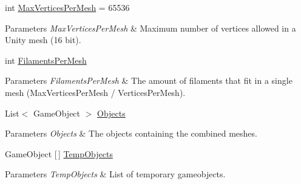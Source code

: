 \begin{DoxyCompactItemize}
int \hyperlink{class_filament_manager_a9401bd69ba21204265cd78a9a94e5b25}{Max\+Vertices\+Per\+Mesh} = 65536
\begin{DoxyCompactList}\small\item\em 
\begin{DoxyParams}{Parameters}
{\em Max\+Vertices\+Per\+Mesh} & Maximum number of vertices allowed in a Unity mesh (16 bit).\\
\hline
\end{DoxyParams}
\end{DoxyCompactList}\item 
\mbox{\label{class_filament_manager_af7195c81156bf891185196a90f6459ca}} 
int \hyperlink{class_filament_manager_af7195c81156bf891185196a90f6459ca}{Filaments\+Per\+Mesh}
\begin{DoxyCompactList}\small\item\em 
\begin{DoxyParams}{Parameters}
{\em Filaments\+Per\+Mesh} & The amount of filaments that fit in a single mesh (Max\+Vertices\+Per\+Mesh / Vertices\+Per\+Mesh).\\
\hline
\end{DoxyParams}
\end{DoxyCompactList}\item 
\mbox{\label{class_filament_manager_ac2355633fcdba276a7759483288e2555}} 
List$<$ Game\+Object $>$ \hyperlink{class_filament_manager_ac2355633fcdba276a7759483288e2555}{Objects}
\begin{DoxyCompactList}\small\item\em 
\begin{DoxyParams}{Parameters}
{\em Objects} & The objects containing the combined meshes.\\
\hline
\end{DoxyParams}
\end{DoxyCompactList}\item 
\mbox{\label{class_filament_manager_a22596f86cb407fa0a91b7c3118ea2284}} 
Game\+Object \mbox{[}$\,$\mbox{]} \hyperlink{class_filament_manager_a22596f86cb407fa0a91b7c3118ea2284}{Temp\+Objects}
\begin{DoxyCompactList}\small\item\em 
\begin{DoxyParams}{Parameters}
{\em Temp\+Objects} & List of temporary gameobjects.\\

\end{DoxyParams}
\end{DoxyCompactList}
\end{DoxyCompactItemize}
